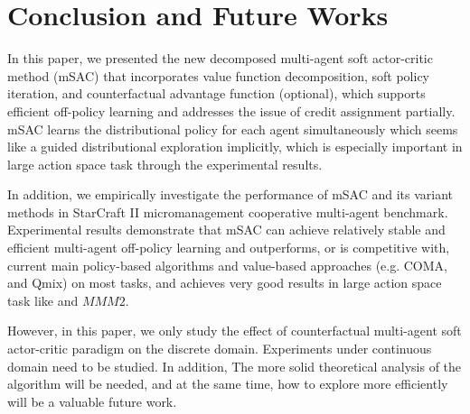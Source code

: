 \documentclass[runningheads]{llncs}
\begin{document}
\section{Conclusion and Future Works}

In this paper, we presented the new decomposed multi-agent soft actor-critic method (mSAC) that incorporates value function decomposition, soft policy iteration, and counterfactual advantage function (optional), which supports efficient off-policy learning and addresses the issue of credit assignment partially.
mSAC learns the distributional policy for each agent simultaneously which seems like a guided distributional exploration implicitly,
which is especially important in large action space task through the experimental results. 

In addition, we empirically investigate the performance of mSAC and its variant methods
in StarCraft II micromanagement cooperative multi-agent benchmark. Experimental results demonstrate that mSAC can achieve relatively stable and efficient multi-agent off-policy learning and outperforms, or is competitive with, current main policy-based algorithms and value-based approaches (e.g. COMA, and Qmix) on most tasks, and achieves very good results in large action space task like  and $MMM2$.

However, in this paper, we only study the effect of counterfactual multi-agent soft actor-critic paradigm on the discrete domain. 
Experiments under continuous domain need to be studied. In addition,
The more solid theoretical analysis of the algorithm will be needed, and at the same time, how to explore more efficiently will be a valuable future work. 
\end{document}
